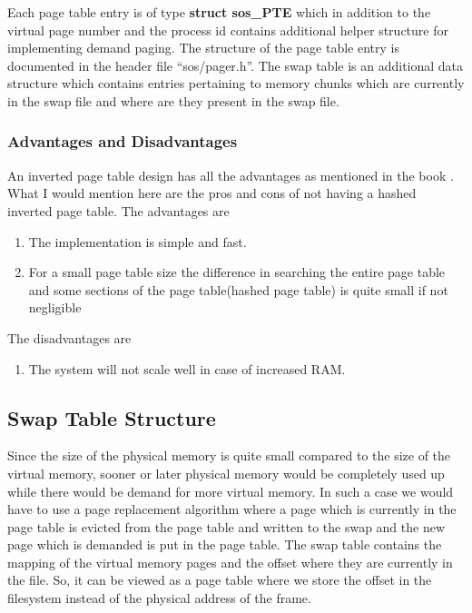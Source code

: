 \documentclass[a4paper, 11pt]{article}
\begin{document}
Each page table entry is of type {\bf struct sos\_PTE} which in
addition to the virtual page number and the process id contains
additional helper structure for implementing demand paging. The
structure of the page table entry is documented in the header file
``sos/pager.h''. The swap table is an additional data
structure which contains entries pertaining to memory chunks which are
currently in the swap file and where are they present in the swap file.

\subsubsection{Advantages and Disadvantages}
An inverted page table design has all the advantages as mentioned in
the book \cite[Page~395]{tanenbaum}. What I would mention here are the
pros and cons of not having a hashed inverted page table. The
advantages are
\begin{enumerate}
\item The implementation is simple and fast.
\item For a small page table size the difference in searching the entire
  page table and some sections of the page table(hashed page table) is
  quite small if not negligible
\end{enumerate}
The disadvantages are
\begin{enumerate}
\item The system will not scale well in case of increased RAM.
\end{enumerate}
 
\subsection{Swap Table Structure}
Since the size of the physical memory is quite small compared to the
size of the virtual memory, sooner or later physical memory would be
completely used up while there would be demand for more virtual
memory. In such a case we would have to use a page replacement
algorithm where a page which is currently in the page table is evicted
from the page table and written to the swap and the new page which is
demanded is put in the page table. The swap table contains the mapping
of the virtual memory pages and the offset where they are currently in
the file. So, it can be viewed as a page table where we store the
offset in the filesystem instead of the physical address of the frame.
\end{document}
